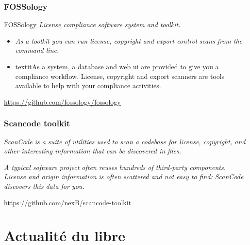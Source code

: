 \documentclass{beamer}
\begin{document}


\begin{frame}\frametitle{FOSSology}
  \begin{block}{FOSSology}
    \textit{License compliance software system and toolkit.}
  \end{block}
  \begin{itemize}
  \item \textit{As a toolkit you can run license, copyright and export
      control scans from the command line.}
  \item textit{As a system, a database and web ui are provided to give
      you a compliance workflow. License, copyright and export
      scanners are tools available to help with your compliance
      activities.}
  \end{itemize}
  \url{https://github.com/fossology/fossology}
\end{frame}


\begin{frame}[plain]%
%  
\end{frame}



\begin{frame}\frametitle{Scancode toolkit}
  \textit{ ScanCode is a suite of utilities used to scan a codebase
    for license, copyright, and other interesting information that can
    be discovered in files.}

  \textit{A typical software project often reuses hundreds of
    third-party components. License and origin information is often
    scattered and not easy to find: ScanCode discovers this data for
    you.}

  \url{https://github.com/nexB/scancode-toolkit}
\end{frame}

\begin{frame}[plain]%
%  
\end{frame}



\section{Actualité du libre}
\end{document}
